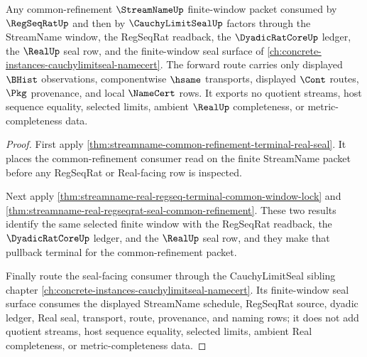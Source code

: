 \begin{theorem}
\label{thm:streamname-cauchy-limit-seal-forward-lattice}
Any common-refinement $\StreamNameUp$ finite-window packet consumed by $\RegSeqRatUp$ and then by $\CauchyLimitSealUp$ factors through the StreamName window, the RegSeqRat readback, the $\DyadicRatCoreUp$ ledger, the $\RealUp$ seal row, and the finite-window seal surface of \autoref{ch:concrete-instances-cauchylimitseal-namecert}. The forward route carries only displayed $\BHist$ observations, componentwise $\hsame$ transports, displayed $\Cont$ routes, $\Pkg$ provenance, and local $\NameCert$ rows. It exports no quotient streams, host sequence equality, selected limits, ambient $\RealUp$ completeness, or metric-completeness data.
\end{theorem}
\begin{proof}
First apply \autoref{thm:streamname-common-refinement-terminal-real-seal}. It places the common-refinement consumer read on the finite StreamName packet before any RegSeqRat or Real-facing row is inspected.

Next apply \autoref{thm:streamname-real-regseq-terminal-common-window-lock} and \autoref{thm:streamname-real-regseqrat-seal-common-refinement}. These two results identify the same selected finite window with the RegSeqRat readback, the $\DyadicRatCoreUp$ ledger, and the $\RealUp$ seal row, and they make that pullback terminal for the common-refinement packet.

Finally route the seal-facing consumer through the CauchyLimitSeal sibling chapter \autoref{ch:concrete-instances-cauchylimitseal-namecert}. Its finite-window seal surface consumes the displayed StreamName schedule, RegSeqRat source, dyadic ledger, Real seal, transport, route, provenance, and naming rows; it does not add quotient streams, host sequence equality, selected limits, ambient Real completeness, or metric-completeness data.
\end{proof}

